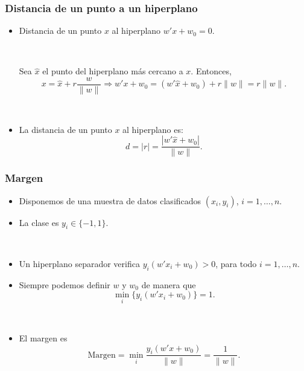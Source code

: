 \documentclass[dvipsnames, pdflatex,slidecentered]{beamer}
\begin{document}
\begin{frame}[plain]
\frametitle{Distancia de un punto a un hiperplano}

\begin{itemize}



\item Distancia de un punto $x$ al hiperplano $w' x + w_0=0$.

\

Sea $\hat x$ el punto del hiperplano más cercano a $x$. Entonces,
\[
x = \hat x + r \frac{w}{\|w\|} \Rightarrow w' x + w_0 = (w' \hat x + w_0) + r \|w\| = r \|w\|.
\]

\

\item La distancia de un punto $x$ al hiperplano es:
\[
d = |r| = \frac{|w' \hat x + w_0|}{\|w\|}.
\]

\end{itemize}



\end{frame}
\begin{frame}[plain]
\frametitle{Margen}

\begin{itemize}


\item Disponemos de una muestra de datos clasificados $(x_i,y_i)$, $i=1,\ldots, n$.

\item La clase es $y_i\in\{-1,1\}$.

\

\item Un hiperplano separador verifica $y_i(w'x_i+w_0)>0$, para todo $i=1,\ldots,n$.

\item Siempre podemos definir $w$ y $w_0$ de manera que 
\[
\min_i \{y_i(w' x_i + w_0)\}=1.
\]

\

\item El margen es
\[
\mbox{Margen} = \min_i  \frac{y_i(w' x + w_0)}{\|w\|} = \frac{1}{\|w\|}.
\]

\end{itemize}

\end{frame}
\end{document}
